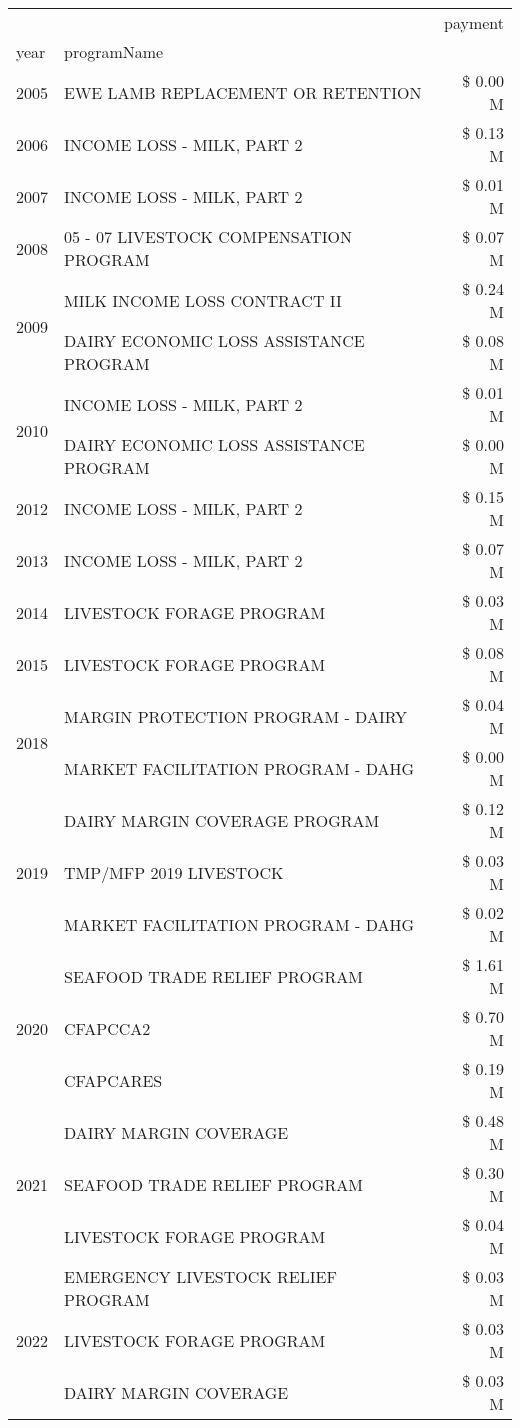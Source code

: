 \begin{tabular}{llr}
\toprule
 &  & payment \\
year & programName &  \\
\midrule
2005 & EWE LAMB REPLACEMENT OR RETENTION & \$ 0.00 M \\
\cline{1-3}
2006 & INCOME LOSS - MILK, PART 2 & \$ 0.13 M \\
\cline{1-3}
2007 & INCOME LOSS - MILK, PART 2 & \$ 0.01 M \\
\cline{1-3}
2008 & 05 - 07 LIVESTOCK COMPENSATION PROGRAM & \$ 0.07 M \\
\cline{1-3}
\multirow[t]{2}{*}{2009} & MILK INCOME LOSS CONTRACT II & \$ 0.24 M \\
 & DAIRY ECONOMIC LOSS ASSISTANCE PROGRAM & \$ 0.08 M \\
\cline{1-3}
\multirow[t]{2}{*}{2010} & INCOME LOSS - MILK, PART 2 & \$ 0.01 M \\
 & DAIRY ECONOMIC LOSS ASSISTANCE PROGRAM & \$ 0.00 M \\
\cline{1-3}
2012 & INCOME LOSS - MILK, PART 2 & \$ 0.15 M \\
\cline{1-3}
2013 & INCOME LOSS - MILK, PART 2 & \$ 0.07 M \\
\cline{1-3}
2014 & LIVESTOCK FORAGE PROGRAM & \$ 0.03 M \\
\cline{1-3}
2015 & LIVESTOCK FORAGE PROGRAM & \$ 0.08 M \\
\cline{1-3}
\multirow[t]{2}{*}{2018} & MARGIN PROTECTION PROGRAM - DAIRY & \$ 0.04 M \\
 & MARKET FACILITATION PROGRAM - DAHG & \$ 0.00 M \\
\cline{1-3}
\multirow[t]{3}{*}{2019} & DAIRY MARGIN COVERAGE PROGRAM & \$ 0.12 M \\
 & TMP/MFP 2019 LIVESTOCK & \$ 0.03 M \\
 & MARKET FACILITATION PROGRAM - DAHG & \$ 0.02 M \\
\cline{1-3}
\multirow[t]{3}{*}{2020} & SEAFOOD TRADE RELIEF PROGRAM & \$ 1.61 M \\
 & CFAPCCA2 & \$ 0.70 M \\
 & CFAPCARES & \$ 0.19 M \\
\cline{1-3}
\multirow[t]{3}{*}{2021} & DAIRY MARGIN COVERAGE & \$ 0.48 M \\
 & SEAFOOD TRADE RELIEF PROGRAM & \$ 0.30 M \\
 & LIVESTOCK FORAGE PROGRAM & \$ 0.04 M \\
\cline{1-3}
\multirow[t]{3}{*}{2022} & EMERGENCY LIVESTOCK RELIEF PROGRAM & \$ 0.03 M \\
 & LIVESTOCK FORAGE PROGRAM & \$ 0.03 M \\
 & DAIRY MARGIN COVERAGE & \$ 0.03 M \\
\cline{1-3}
\bottomrule
\end{tabular}
